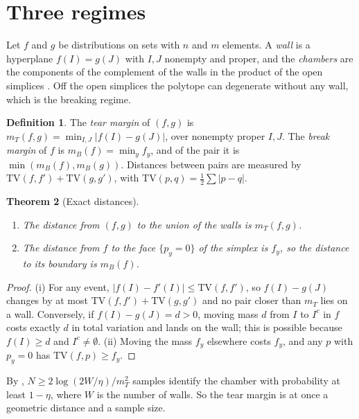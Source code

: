 \documentclass[11pt]{article}
\newtheorem{theorem}{Theorem}[section]
\theoremstyle{definition}
\newtheorem{definition}[theorem]{Definition}
\theoremstyle{remark}
\newcommand{\TV}{\mathrm{TV}}
\begin{document}
\section{Three regimes}\label{sec:regimes}

Let $f$ and $g$ be distributions on sets with $n$ and $m$ elements. A \emph{wall} is a hyperplane $f(I)=g(J)$ with $I,J$
nonempty and proper, and the \emph{chambers} are the components of the complement of the walls in the product of the open
simplices \cite[Def.~6.3]{Conditionals}. Off the open simplices the polytope can degenerate without any wall, which is the
breaking regime.

\begin{definition}\label{def:margins}
The \emph{tear margin} of $(f,g)$ is $m_T(f,g)=\min_{I,J}\lvert f(I)-g(J)\rvert$, over nonempty proper $I,J$. The \emph{break
margin} of $f$ is $m_B(f)=\min_yf_y$, and of the pair it is $\min(m_B(f),m_B(g))$. Distances between pairs are measured by
$\TV(f,f')+\TV(g,g')$, with $\TV(p,q)=\frac12\sum\lvert p-q\rvert$.
\end{definition}

\begin{theorem}[Exact distances]\label{thm:distances}
\leavevmode
\begin{enumerate}[label=(\roman*)]
\item The distance from $(f,g)$ to the union of the walls is $m_T(f,g)$.
\item The distance from $f$ to the face $\{p_y=0\}$ of the simplex is $f_y$, so the distance to its boundary is
  $m_B(f)$.
\end{enumerate}
\end{theorem}
\begin{proof}
(i) For any event, $\lvert f(I)-f'(I)\rvert\le\TV(f,f')$, so $f(I)-g(J)$ changes by at most $\TV(f,f')+\TV(g,g')$ and no
pair closer than $m_T$ lies on a wall. Conversely, if $f(I)-g(J)=d>0$, moving mass $d$ from $I$ to $I^c$ in $f$ costs exactly
$d$ in total variation and lands on the wall; this is possible because $f(I)\ge d$ and $I^c\ne\emptyset$. (ii) Moving the
mass $f_y$ elsewhere costs $f_y$, and any $p$ with $p_y=0$ has $\TV(f,p)\ge f_y$.
\end{proof}

By \cite[Prop.~12.2]{Conditionals}, $N\ge2\log(2W/\eta)/m_T^2$ samples identify the chamber with probability at least
$1-\eta$, where $W$ is the number of walls. So the tear margin is at once a geometric distance and a sample size.
\end{document}
